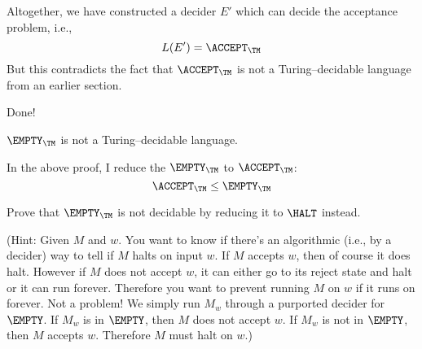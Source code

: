 Altogether, we have constructed a decider $E'$ which can 
decide the acceptance problem, i.e.,
\[
L(E') = \ACCEPT_\TM
\]
But this contradicts the fact that $\ACCEPT_\TM$ is not a 
Turing--decidable language from an earlier section.

Done!

\begin{thm}
$\EMPTY_\TM$ is not a Turing--decidable language.
\end{thm}

In the above proof, I reduce the $\EMPTY_\TM$ to $\ACCEPT_\TM$:
\[
\ACCEPT_\TM \leq \EMPTY_\TM
\]



\newpage
\begin{ex}
Prove that $\EMPTY_\TM$ is not decidable by reducing it to 
$\HALT$ instead.
\end{ex}

(Hint: Given $M$ and $w$.
You want to know if there's an algorithmic (i.e., by a decider) way
to tell if $M$ halts on input $w$.
If $M$ accepts $w$, then of course it does halt.
However if $M$ does not accept $w$, it can either 
go to its reject state and halt or it can run forever.
Therefore you want to prevent running $M$ on $w$
if it runs on forever.
Not a problem!
We simply run $M_w$ through a purported decider for 
$\EMPTY$.
If $M_w$ is in $\EMPTY$, then $M$ does not accept $w$.
If $M_w$ is not in $\EMPTY$, then $M$ accepts $w$.
Therefore $M$ must halt on $w$.)


